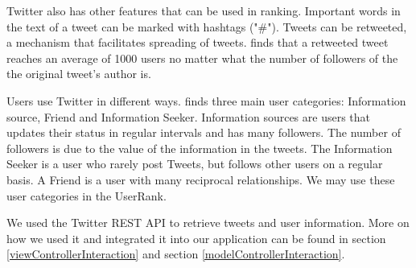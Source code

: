 
Twitter also has other features that can be used in ranking. Important words in the text of a tweet can be marked with hashtags ("\#"). Tweets can be retweeted, a mechanism that facilitates spreading of tweets. \citet{Kwak2010} finds that a retweeted tweet reaches an average of 1000 users no matter what the number of followers of the  the original tweet's author is.


Users use Twitter in different ways. \citet{Akshay2007} finds three main user categories: Information source, Friend and Information Seeker. Information sources are users that updates their status in regular intervals and has many followers. The number of followers is due to the value of the information in the tweets. The Information Seeker is a user who rarely post Tweets, but follows other users on a regular basis. A Friend is a user with many reciprocal relationships. We may use these user categories in the UserRank.

We used the Twitter REST API to retrieve tweets and user information. More on how we used it and integrated it into our application can be found in section \ref{viewControllerInteraction} and section \ref{modelControllerInteraction}. 

